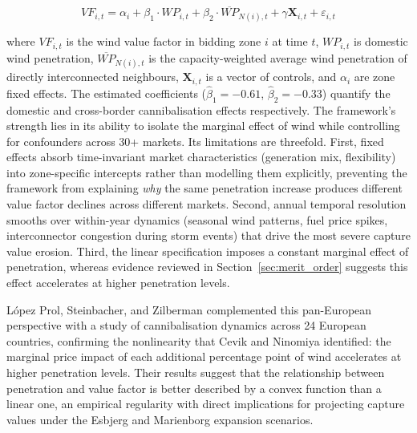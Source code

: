 \begin{equation}
    VF_{i,t} = \alpha_i + \beta_1 \cdot WP_{i,t} + \beta_2 \cdot \overline{WP}_{N(i),t} + \gamma \mathbf{X}_{i,t} + \varepsilon_{i,t}
    \label{eq:stiewe_model}
\end{equation}

where $VF_{i,t}$ is the wind value factor in bidding zone $i$ at time $t$, $WP_{i,t}$ is domestic wind penetration, $\overline{WP}_{N(i),t}$ is the capacity-weighted average wind penetration of directly interconnected neighbours, $\mathbf{X}_{i,t}$ is a vector of controls, and $\alpha_i$ are zone fixed effects. The estimated coefficients ($\hat{\beta}_1 = -0.61$, $\hat{\beta}_2 = -0.33$) quantify the domestic and cross-border cannibalisation effects respectively. The framework's strength lies in its ability to isolate the marginal effect of wind while controlling for confounders across 30+ markets. Its limitations are threefold. First, fixed effects absorb time-invariant market characteristics (generation mix, flexibility) into zone-specific intercepts rather than modelling them explicitly, preventing the framework from explaining \textit{why} the same penetration increase produces different value factor declines across different markets. Second, annual temporal resolution smooths over within-year dynamics (seasonal wind patterns, fuel price spikes, interconnector congestion during storm events) that drive the most severe capture value erosion. Third, the linear specification imposes a constant marginal effect of penetration, whereas evidence reviewed in Section~\ref{sec:merit_order} suggests this effect accelerates at higher penetration levels.

\vspace{4pt}

L\'{o}pez Prol, Steinbacher, and Zilberman \cite{LopezProl2024} complemented this pan-European perspective with a study of cannibalisation dynamics across 24 European countries, confirming the nonlinearity that Cevik and Ninomiya \cite{Cevik2022} identified: the marginal price impact of each additional percentage point of wind accelerates at higher penetration levels. Their results suggest that the relationship between penetration and value factor is better described by a convex function than a linear one, an empirical regularity with direct implications for projecting capture values under the Esbjerg and Marienborg expansion scenarios.

\vspace{4pt}


